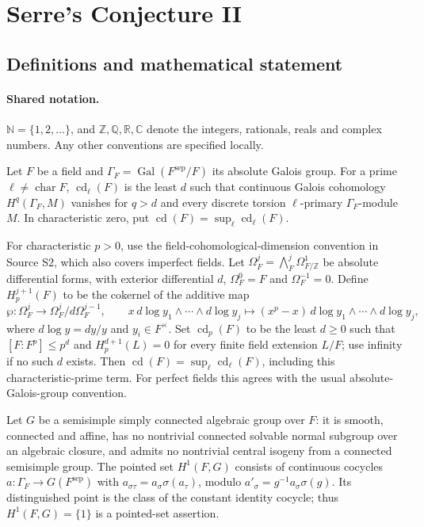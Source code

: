 \documentclass[11pt]{article}
\begin{document}
\section{Serre's Conjecture II}\label{statement}

\subsection{Definitions and mathematical statement}

\paragraph{Shared notation.}$\mathbb N=\{1,2,\ldots\}$, and $\mathbb Z,\mathbb Q,\mathbb R,\mathbb C$ denote the integers, rationals, reals and complex numbers. Any other conventions are specified locally.


Let $F$ be a field and $\Gamma_F=\operatorname{Gal}(F^{\mathrm{sep}}/F)$ its absolute Galois group. For a prime $\ell\ne\operatorname{char}F$, $\operatorname{cd}_\ell(F)$ is the least $d$ such that continuous Galois cohomology $H^q(\Gamma_F,M)$ vanishes for $q>d$ and every discrete torsion $\ell$-primary $\Gamma_F$-module $M$. In characteristic zero, put $\operatorname{cd}(F)=\sup_\ell\operatorname{cd}_\ell(F)$.

For characteristic $p>0$, use the field-cohomological-dimension convention in Source S2, which also covers imperfect fields. Let $\Omega_F^j=\bigwedge_F^j\Omega^1_{F/\mathbb Z}$ be absolute differential forms, with exterior differential $d$, $\Omega_F^0=F$ and $\Omega_F^{-1}=0$. Define $H_p^{j+1}(F)$ to be the cokernel of the additive map
\[
 \wp:\Omega_F^j\longrightarrow\Omega_F^j/d\Omega_F^{j-1},\qquad
 x\,d\log y_1\wedge\cdots\wedge d\log y_j
 \longmapsto (x^p-x)\,d\log y_1\wedge\cdots\wedge d\log y_j,
\]
where $d\log y=dy/y$ and $y_i\in F^\times$. Set $\operatorname{cd}_p(F)$ to be the least $d\ge0$ such that $[F:F^p]\le p^d$ and $H_p^{d+1}(L)=0$ for every finite field extension $L/F$; use infinity if no such $d$ exists. Then $\operatorname{cd}(F)=\sup_\ell\operatorname{cd}_\ell(F)$, including this characteristic-prime term. For perfect fields this agrees with the usual absolute-Galois-group convention.

Let $G$ be a semisimple simply connected algebraic group over $F$: it is smooth, connected and affine, has no nontrivial connected solvable normal subgroup over an algebraic closure, and admits no nontrivial central isogeny from a connected semisimple group. The pointed set $H^1(F,G)$ consists of continuous cocycles $a:\Gamma_F\to G(F^{\mathrm{sep}})$ with $a_{\sigma\tau}=a_\sigma\sigma(a_\tau)$, modulo $a'_\sigma=g^{-1}a_\sigma\sigma(g)$. Its distinguished point is the class of the constant identity cocycle; thus $H^1(F,G)=\{1\}$ is a pointed-set assertion.
\end{document}
